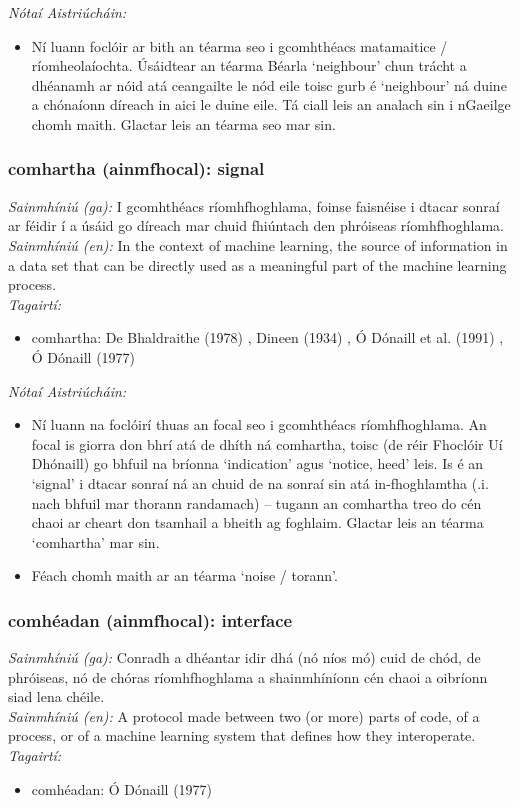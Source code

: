  \noindent \textit{Nótaí Aistriúcháin:}
\begin{itemize}
	\item Ní luann foclóir ar bith an téarma seo i gcomhthéacs matamaitice / ríomheolaíochta. Úsáidtear an téarma Béarla `neighbour' chun trácht a dhéanamh ar nóid atá ceangailte le nód eile toisc gurb é `neighbour' ná duine a chónaíonn díreach in aici le duine eile. Tá ciall leis an analach sin i nGaeilge chomh maith. Glactar leis an téarma seo mar sin.
\end{itemize}


\subsubsection*{comhartha (ainmfhocal): signal}
 \noindent \textit{Sainmhíniú (ga):} I gcomhthéacs ríomhfhoghlama, foinse faisnéise i dtacar sonraí ar féidir í a úsáid go díreach mar chuid fhiúntach den phróiseas ríomhfhoghlama.
\\
 \noindent \textit{Sainmhíniú (en):} In the context of machine learning, the source of information in a data set that can be directly used as a meaningful part of the machine learning process.
\\
 \noindent \textit{Tagairtí:}
\begin{itemize}
	\item comhartha: De Bhaldraithe (1978) \cite{de-bhaldraithe}, Dineen (1934) \cite{dineen}, Ó Dónaill et al. (1991) \cite{focloir-beag}, Ó Dónaill (1977) \cite{odonaill}
\end{itemize}

 \noindent \textit{Nótaí Aistriúcháin:}
\begin{itemize}
	\item Ní luann na foclóirí thuas an focal seo i gcomhthéacs ríomhfhoghlama. An focal is giorra don bhrí atá de dhíth ná comhartha, toisc (de réir Fhoclóir Uí Dhónaill) go bhfuil na bríonna `indication' agus `notice, heed' leis. Is é an `signal' i dtacar sonraí ná an chuid de na sonraí sin atá in-fhoghlamtha (.i. nach bhfuil mar thorann randamach) -- tugann an comhartha treo do cén chaoi ar cheart don tsamhail a bheith ag foghlaim. Glactar leis an téarma `comhartha' mar sin.
	\item Féach chomh maith ar an téarma `noise / torann'.
\end{itemize}


\subsubsection*{comhéadan (ainmfhocal): interface}
 \noindent \textit{Sainmhíniú (ga):} Conradh a dhéantar idir dhá (nó níos mó) cuid de chód, de phróiseas, nó de chóras ríomhfhoghlama a shainmhíníonn cén chaoi a oibríonn siad lena chéile.
\\
 \noindent \textit{Sainmhíniú (en):} A protocol made between two (or more) parts of code, of a process, or of a machine learning system that defines how they interoperate.
\\
 \noindent \textit{Tagairtí:}
\begin{itemize}
	\item comhéadan: Ó Dónaill (1977) \cite{odonaill}
\end{itemize}

